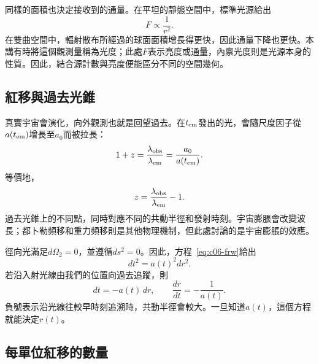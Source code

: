同樣的面積也決定接收到的通量。在平坦的靜態空間中，標準光源給出
\begin{equation}
F\propto\frac{1}{r^2}.
\end{equation}
在雙曲空間中，輻射散布所經過的球面面積增長得更快，因此通量下降也更快。本講有時將這個觀測量稱為光度；此處\(F\)表示亮度或通量，內禀光度則是光源本身的性質。因此，結合源計數與亮度便能區分不同的空間幾何。

\subsection{紅移與過去光錐}

真實宇宙會演化，向外觀測也就是回望過去。在\(t_{\rm em}\)發出的光，會隨尺度因子從\(a(t_{\rm em})\)增長至\(a_0\)而被拉長：
\begin{equation}
1+z
=\frac{\lambda_{\rm obs}}{\lambda_{\rm em}}
=\frac{a_0}{a(t_{\rm em})}.
\label{eq:c06-redshift}
\end{equation}
等價地，
\begin{equation}
z=\frac{\lambda_{\rm obs}}{\lambda_{\rm em}}-1.
\end{equation}
過去光錐上的不同點，同時對應不同的共動半徑和發射時刻。宇宙膨脹會改變波長；都卜勒頻移和重力頻移則是其他物理機制，但此處討論的是宇宙膨脹的效應。

\begin{classroomqa}
\end{classroomqa}

徑向光滿足\(d\Omega_2=0\)，並遵循\(ds^2=0\)。因此，方程~\eqref{eq:c06-frw}給出
\begin{equation}
dt^2=a(t)^2dr^2.
\end{equation}
若沿入射光線由我們的位置向過去追蹤，則
\begin{equation}
dt=-a(t)\,dr,
\qquad
\frac{dr}{dt}=-\frac{1}{a(t)}.
\label{eq:c06-null-ray}
\end{equation}
負號表示沿光線往較早時刻追溯時，共動半徑會較大。一旦知道\(a(t)\)，這個方程就能決定\(r(t)\)。

\subsection{每單位紅移的數量}

